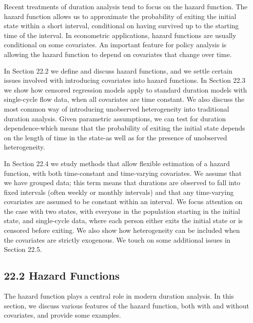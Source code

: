 \documentclass[10pt]{article}
\begin{document}
Recent treatments of duration analysis tend to focus on the hazard function. The hazard function allows us to approximate the probability of exiting the initial state within a short interval, conditional on having survived up to the starting time of the interval. In econometric applications, hazard functions are usually conditional on some covariates. An important feature for policy analysis is allowing the hazard function to depend on covariates that change over time.

In Section 22.2 we define and discuss hazard functions, and we settle certain issues involved with introducing covariates into hazard functions. In Section 22.3 we show how censored regression models apply to standard duration models with single-cycle flow data, when all covariates are time constant. We also discuss the most common way of introducing unobserved heterogeneity into traditional duration analysis. Given parametric assumptions, we can test for duration dependence-which means that the probability of exiting the initial state depends on the length of time in the state-as well as for the presence of unobserved heterogeneity.

In Section 22.4 we study methods that allow flexible estimation of a hazard function, with both time-constant and time-varying covariates. We assume that we have grouped data; this term means that durations are observed to fall into fixed intervals (often weekly or monthly intervals) and that any time-varying covariates are assumed to be constant within an interval. We focus attention on the case with two states, with everyone in the population starting in the initial state, and single-cycle data, where each person either exits the initial state or is censored before exiting. We also show how heterogeneity can be included when the covariates are strictly exogenous. We touch on some additional issues in Section 22.5.

\subsection*{22.2 Hazard Functions}
The hazard function plays a central role in modern duration analysis. In this section, we discuss various features of the hazard function, both with and without covariates, and provide some examples.
\end{document}
